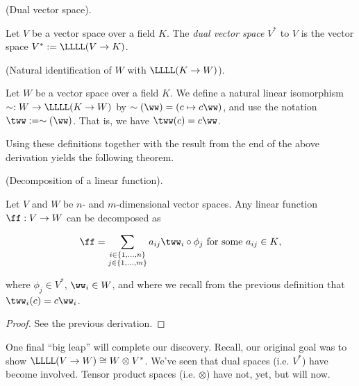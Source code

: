 \begin{defn}
\label{ch::motivated_intro::defn::dual_space_1}
    (Dual vector space).
    
    Let $V$ be a vector space over a field $K$. The \textit{dual vector space} $V^*$ to $V$ is the vector space $V^* := \LLLL(V \rightarrow K)$.
\end{defn}

\begin{defn}
\label{ch::lin_alg::defn::iso_V_to_linear_functions_K_V}
    (Natural identification of $W$ with $\LLLL(K \rightarrow W)$).

    Let $W$ be a vector space over a field $K$. We define a natural linear isomorphism $\sim:W \rightarrow \LLLL(K \rightarrow W)$ by $\sim(\ww) = (c \mapsto c\ww)$, and use the notation $\tww := \sim(\ww)$. That is, we have $\tww(c) = c\ww$.
\end{defn}

Using these definitions together with the result from the end of the above derivation yields the following theorem.

\begin{theorem}
\label{ch::motivated_intro::thm::decomposition_of_a_linear_function}
    (Decomposition of a linear function).
    
    Let $V$ and $W$ be $n$- and $m$-dimensional vector spaces. Any linear function $\ff:V \rightarrow W$ can be decomposed as
    
    \begin{align*}
        \ff = \sum_{\substack{i \in \{1, ..., n\} \\ j \in \{1, ..., m\}}} a_{ij} \tww_i \circ \phi_j \text{ for some $a_{ij} \in K$},
    \end{align*}
    
    where $\phi_j \in V^*$, $\ww_i \in W$, and where we recall from the previous definition that $\tww_i(c) = c\ww_i$.
\end{theorem}

\begin{proof}
    See the previous derivation.
\end{proof}

One final ``big leap'' will complete our discovery. Recall, our original goal was to show ${\LLLL(V \rightarrow W) \cong W \otimes V^*}$. We've seen that dual spaces (i.e. $V^*$) have become involved. Tensor product spaces (i.e. $\otimes$) have not, yet, but will now.

